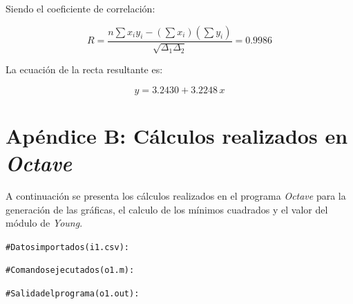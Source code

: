 \documentclass[letter,11pt]{article}
\begin{document}
Siendo el coeficiente de correlación:

\begin{equation*}
    R = \frac{n \sum x_i y_i - (\sum x_i)(\sum y_i)}{\sqrt{\Delta_1 \Delta_2}}
      = 0.9986
\end{equation*}
\vspace{0.10cm}

La ecuación de la recta resultante es:

\begin{equation*}
    y = \num{3.2430} + \num{3.2248}\, x
\end{equation*}
\vspace{0.10cm}

\newpage
\section*{Apéndice B: Cálculos realizados en \emph{Octave}}

A continuación se presenta los cálculos realizados en el programa \emph{Octave}
para la generación de las gráficas, el calculo de los mínimos cuadrados y el
valor del módulo de \emph{Young}.

\begin{shaded}
\begin{alltt}
\footnotesize
\# Datos importados (i1.csv):

\# Comandos ejecutados (o1.m):



\# Salida del programa (o1.out):

\normalsize
\end{alltt}
\end{shaded}
\end{document}
